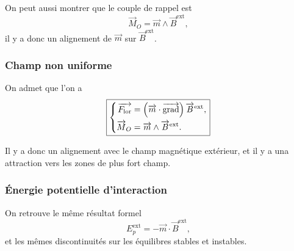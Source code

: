 On peut aussi montrer que le couple de rappel est
\begin{equation}
    \boxed{
        \vec{M}_O=\vec{m}\wedge\vec{B}^{\mathrm{ext}},
    }
\end{equation}
il y a donc un alignement de $\vec{m}$ sur $\vec{B}^{\mathrm{ext}}$.

\subsubsection{Champ non uniforme}
On admet que l'on a 
\begin{equation}
    \boxed{
        \left\lbrace
    \begin{aligned}
        \protect\overrightarrow{{F_{\mathrm{lor}}}}&=\left(\protect\overrightarrow{{m}}\cdot\operatorname{\overrightarrow{\text{grad}}}\right)\protect\overrightarrow{{B}}^{\mathrm{ext}},\\
        \protect\overrightarrow{{M}}_O&=\protect\overrightarrow{{m}}\wedge\protect\overrightarrow{{B}}^{\mathrm{ext}}.
    \end{aligned}
    \right.}
\end{equation}

Il y a donc un alignement avec le champ magnétique extérieur, et il y a una attraction vers les zones de plus fort champ.

\subsubsection{Énergie potentielle d'interaction}

On retrouve le même résultat formel
\begin{equation}
    \boxed{
        E_p^{\mathrm{ext}}=-\vec{m}\cdot\vec{B}^{\mathrm{ext}},
    }
\end{equation}
et les mêmes discontinuités sur les équilibres stables et instables.
